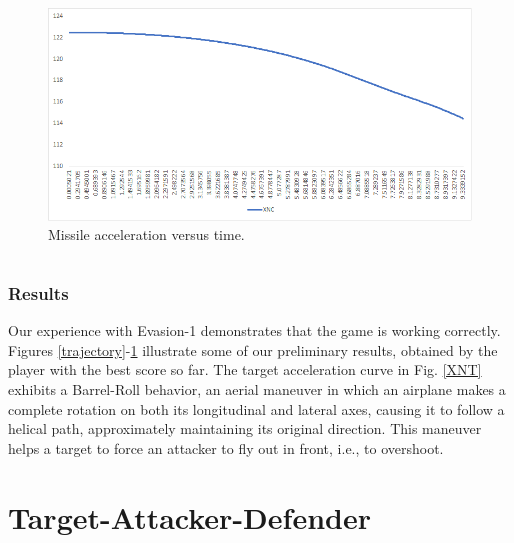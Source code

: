\documentclass{beamer}
\begin{document}
\begin{frame}
\begin{columns}[c]
	\begin{column}{.3\linewidth}
		\begin{figure}[H]
			\centering
			\includegraphics[scale = 0.23]{fig/XNC.PNG}
			\caption{Missile acceleration versus time.}
			\label{XNC}
		\end{figure}
	\end{column}
\end{columns}
\end{frame}
\begin{frame}
\frametitle{Results}
Our experience with Evasion-1 demonstrates that the game is working correctly. Figures \ref{trajectory}-\ref{XNC} illustrate some of our preliminary results, obtained by the player with the best score so far. The target acceleration curve in Fig. \ref{XNT} exhibits a Barrel-Roll behavior, an aerial maneuver in which an airplane makes a complete rotation on both its longitudinal and lateral axes, causing it to follow a helical path, approximately maintaining its original direction. This maneuver helps a target to force an attacker to fly out in front, i.e., to overshoot. 
\end{frame}

\section{Target-Attacker-Defender}

\end{document}
